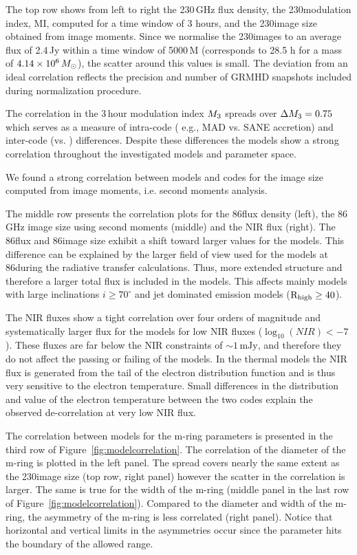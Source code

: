 The top row shows from left to right the 230\,GHz flux density, the 230\GHz modulation index, MI, computed for a time window of 3 hours, and the 230\GHz image size obtained from image moments. Since we normalise the 230\GHz images to an average flux of 2.4\,Jy within a time window of 5000\,M (corresponds to 28.5 h for \sgra a mass of $4.14\times 10^6\,M_\odot$), the scatter around this values is small. The deviation from an ideal correlation reflects the precision and number of GRMHD snapshots included during normalization procedure.

The correlation in the 3\,hour modulation index $M_{3}$ spreads over $\Delta M_{3}=0.75$ which serves as a measure of intra-code ( e.g., MAD vs. SANE accretion) and inter-code (\bhac vs. \kharma) differences. Despite these differences the models show a strong correlation throughout the investigated models and parameter space.

We found a strong correlation between models and codes for the image size computed from image moments, i.e. second moments analysis.

The middle row presents the correlation plots for the 86\GHz flux density (left), the 86\,GHz image size using second moments (middle) and the NIR flux (right). The 86\GHz flux and 86\GHz image size exhibit a shift toward larger values for the \bhac models. This difference can be explained by the larger field of view used for the \bhac models at 86\GHz during the radiative transfer calculations. Thus, more extended structure and therefore a larger total flux is included in the \bhac models. This affects mainly models with large inclinations $i\geq70^\circ$ and jet dominated emission models ($\rm{R}_{\rm high}\geq 40$).

The NIR fluxes show a tight correlation over four orders of magnitude and systematically larger flux for the \bhac models for low NIR fluxes ($\log_{10}(NIR) < -7$). These fluxes are far below the NIR constraints of $\sim 1\,\mathrm{mJy}$, and therefore they do not affect the passing or failing of the models. In the thermal models the NIR flux is generated from the tail of the electron distribution function and is thus very sensitive to the electron temperature. Small differences in the distribution and value of the electron temperature between the two codes explain the observed de-correlation at very low NIR flux.

The correlation between models for the m-ring parameters is presented in the third row of Figure~\ref{fig:modelcorrelation}. The correlation of the diameter of the m-ring is plotted in the left panel. The spread covers nearly the same extent as the 230\GHz image size (top row, right panel) however the scatter in the correlation is larger.  The same is true for the width of the m-ring (middle panel in the last row of Figure~\ref{fig:modelcorrelation}). Compared to the diameter and width of the m-ring, the asymmetry of the m-ring is less correlated (right panel). Notice that horizontal and vertical limits in the asymmetries occur since the parameter hits the boundary of the allowed range.

